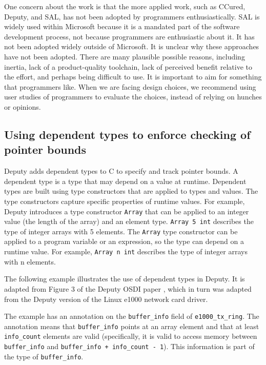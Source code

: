 One concern about the work is that the more applied work, such as
CCured, Deputy, and SAL, has not been adopted by programmers
enthusiastically. SAL is widely used within Microsoft because it is a
mandated part of the software development process, not because
programmers are enthusiastic about it. It has not been adopted widely
outside of Microsoft. It is unclear why these approaches have not been
adopted. There are many plausible possible reasons, including inertia,
lack of a product-quality toolchain, lack of perceived benefit relative
to the effort, and perhaps being difficult to use. It is important to
aim for something that programmers like. When we are facing design
choices, we recommend using user studies of programmers to evaluate the
choices, instead of relying on hunches or opinions.

\subsection{Using dependent types to enforce checking of pointer bounds}

Deputy adds dependent types to C to specify and track pointer bounds. A
dependent type is a type that may depend on a value at runtime.
Dependent types are built using type constructors that are applied to
types and values. The type constructors capture specific properties of
runtime values. For example, Deputy introduces a type constructor
\verb|Array| that can be applied to an integer value (the length of the
array) and an element type. \verb|Array 5 int| describes the type of
integer arrays with 5 elements. The \verb|Array| type constructor can be
applied to a program variable or an expression, so the type can depend
on a runtime value. For example, \verb|Array n int| describes the type
of integer arrays with n elements.

The following example illustrates the use of dependent types in Deputy.
It is adapted from Figure 3 of the Deputy OSDI paper , which in turn was
adapted from the Deputy version of the Linux e1000 network card driver.

The example has an annotation on the \texttt{buffer\_info} field of
\texttt{e1000\_tx\_ring}. The annotation means that
\texttt{buffer\_info} points at an array element and that at least
\texttt{info\_count} elements are valid (specifically, it is valid to
access memory between \texttt{buffer\_info} and \texttt{buffer\_info +
info\_count - 1}). This information is part of the type of
\texttt{buffer\_info}.

